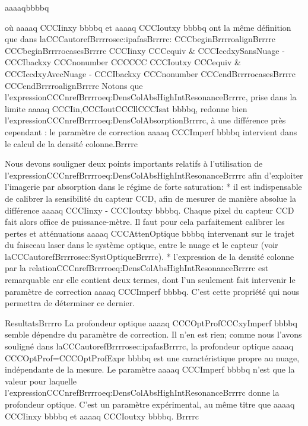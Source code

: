 aaaaqbbbbq



où aaaaq CCCIinxy bbbbq et aaaaq CCCIoutxy bbbbq ont la même définition que dans laCCCautorefBrrrrosec:ipafasBrrrrc:
CCCbeginBrrrroalignBrrrrc
CCCbeginBrrrrocasesBrrrrc
CCCIinxy  CCCequiv & CCCIccdxySansNuage - CCCIbackxy CCCnonumber 
 CCCCCC
CCCIoutxy CCCequiv & CCCIccdxyAvecNuage - CCCIbackxy CCCnonumber 
CCCendBrrrrocasesBrrrrc
CCCendBrrrroalignBrrrrc
Notons que l'expressionCCCnrefBrrrroeq:DensColAbsHighIntResonanceBrrrrc, prise dans la limite aaaaq CCCIin,CCCIoutCCCllCCCIsat bbbbq, redonne bien l'expressionCCCnrefBrrrroeq:DensColAbsorptionBrrrrc, à une différence près cependant : le paramètre de correction aaaaq CCCImperf bbbbq intervient dans le calcul de la densité colonne.Brrrrc



Nous devons souligner deux points importants relatifs à l'utilisation de l'expressionCCCnrefBrrrroeq:DensColAbsHighIntResonanceBrrrrc afin d'exploiter l'imagerie par absorption dans le régime de forte saturation:
	* il est indispensable de calibrer la sensibilité du capteur CCD, afin de mesurer de manière absolue	
	 la différence aaaaq CCCIinxy - CCCIoutxy bbbbq. Chaque pixel du capteur CCD fait alors office de puissance-mètre. Il faut pour cela parfaitement calibrer les pertes et atténuations aaaaq CCCAttenOptique bbbbq intervenant sur le trajet du faisceau laser dans le système optique, entre le nuage et le capteur (voir laCCCautorefBrrrrosec:SystOptiqueBrrrrc).
	* l'expression de la densité colonne par la relationCCCnrefBrrrroeq:DensColAbsHighIntResonanceBrrrrc est remarquable car elle contient deux termes, dont l'un seulement fait intervenir le paramètre de correction aaaaq CCCImperf bbbbq. C'est cette propriété qui nous permettra de déterminer ce dernier.





ResultatsBrrrro
La profondeur optique aaaaq CCCOptProfCCCxyImperf bbbbq semble dépendre du paramètre de correction. Il n'en est rien; comme nous l'avons souligné dans laCCCautorefBrrrrosec:ipafasBrrrrc, la profondeur optique aaaaq CCCOptProf=CCCOptProfExpr bbbbq est une caractéristique propre au nuage, indépendante de la mesure. Le paramètre aaaaq CCCImperf bbbbq n'est que la valeur pour laquelle l'expressionCCCnrefBrrrroeq:DensColAbsHighIntResonanceBrrrrc donne la profondeur optique. C'est un paramètre expérimental, au même titre que aaaaq CCCIinxy bbbbq et aaaaq CCCIoutxy bbbbq. 
Brrrrc




